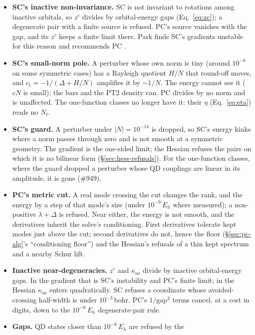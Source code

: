 \documentclass[11pt]{article}
\begin{document}
\begin{itemize}
\item \textbf{SC's inactive non-invariance.} SC is not invariant to rotations
  among inactive orbitals, so $z^c$ divides by orbital-energy gaps
  (Eq.~\eqref{eq:zc}); a degenerate pair with a finite source is refused. PC's
  source vanishes with the gap, and its $z^c$ keeps a finite limit there. Park finds SC's gradients unstable for this
  reason and recommends PC \cite{park2019}.
\item \textbf{SC's small-norm pole.} A perturber whose own norm is tiny
  (around $10^{-8}$ on some symmetric cases) has a Rayleigh quotient $H/N$
  that round-off moves, and $c_t = -1/(\Delta + H/N)$ amplifies it by
  $\sim 1/N$. The energy cannot see it ($cN$ is small); the bars and the PT2
  density can. PC divides by no norm and is unaffected. The one-function
  classes no longer have it: their $\eta$ (Eq.~\eqref{eq:eta}) reads no $N_t$.
\item \textbf{SC's guard.} A perturber under $|N| = 10^{-14}$ is dropped, so
  SC's energy kinks where a norm passes through zero and is not smooth at a
  symmetric geometry. The gradient is the one-sided limit; the Hessian
  refuses the pairs on which it is no bilinear form
  (\S\ref{sec:hess-refusals}). For the one-function classes, where the
  guard dropped a perturber whose QD couplings are linear in its amplitude,
  it is gone (\#949).
\item \textbf{PC's metric cut.} A real mode crossing the cut changes the
  rank, and the energy by a step of that mode's size (under
  $10^{-9}\,E_h$ where measured); a non-positive $\lambda + \Delta$ is
  refused. Near either, the energy is not smooth, and the derivatives inherit the solve's conditioning.
  First derivatives tolerate kept modes just above the cut; second
  derivatives do not, hence the floor (\S\ref{sec:pc-alg}'s ``conditioning
  floor'') and the Hessian's refusals of a thin kept spectrum and a nearby
  Schur lift.
\item \textbf{Inactive near-degeneracies.} $z^c$ and $\kappa_{oo}$ divide by
  inactive orbital-energy gaps. In the gradient that is SC's
  instability and PC's finite limit; in the Hessian $\kappa_{oo}$ enters
  quadratically. SC refuses a coordinate whose avoided-crossing half-width
  is under $10^{-3}$\,bohr. PC's $1/\mathrm{gap}^2$ terms cancel, at a
  cost in digits, down to the $10^{-6}\,E_h$ degenerate-pair rule.
\item \textbf{Gaps.} QD states closer than $10^{-8}\,E_h$ are refused by the

\end{itemize}
\end{document}
